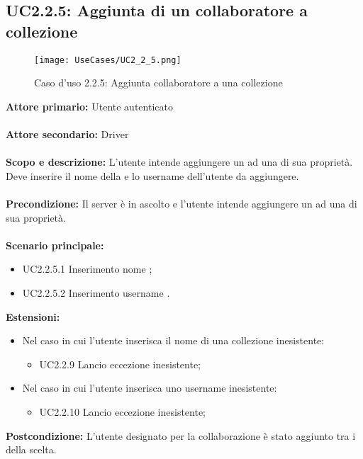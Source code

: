 \documentclass{scalatekids-article}
\begin{document}
\subsection{UC2.2.5: Aggiunta di un collaboratore a collezione}
\begin{figure}[H]
  \begin{center}
    \texttt{[image: UseCases/UC2\_2\_5.png]}
    \caption*{Caso d'uso 2.2.5: Aggiunta collaboratore a una collezione}
  \end{center}
\end{figure}
\textbf{Attore primario:} Utente autenticato\\ \\
\textbf{Attore secondario:} Driver\\ \\
\textbf{Scopo e descrizione:} L'utente intende aggiungere un  ad una  di sua proprietà. Deve inserire il nome della  e lo username dell'utente da aggiungere.\\ \\
\textbf{Precondizione:} Il server è in ascolto e l'utente intende aggiungere un  ad una  di sua proprietà.\\ \\
\textbf{Scenario principale:}
\begin{itemize}
\item UC2.2.5.1 Inserimento nome ;
\item UC2.2.5.2 Inserimento username .
\end{itemize}
\textbf{Estensioni:}
\begin{itemize}
\item Nel caso in cui l'utente inserisca il nome di una collezione inesistente:
  \begin{itemize}
  \item UC2.2.9 Lancio eccezione  inesistente;
  \end{itemize}
\item Nel caso in cui l'utente inserisca uno username inesistente:
  \begin{itemize}
  \item UC2.2.10 Lancio eccezione  inesistente;
  \end{itemize}
\end{itemize}
\textbf{Postcondizione:} L'utente designato per la collaborazione è stato aggiunto tra i  della  scelta.
\end{document}

